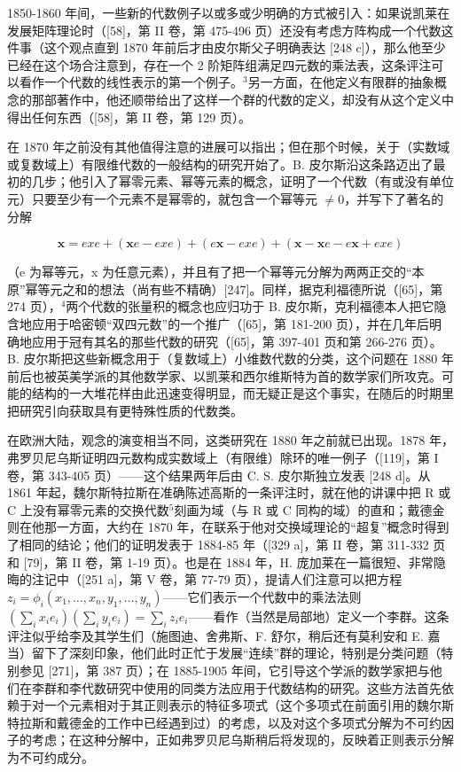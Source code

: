 1850-1860 年间，一些新的代数例子以或多或少明确的方式被引入：如果说凯莱在发展矩阵理论时（{[}58{]}，第 II 卷，第 475-496 页）还没有考虑方阵构成一个代数这件事（这个观点直到 1870 年前后才由皮尔斯父子明确表达 {[}248 c{]}），那么他至少已经在这个场合注意到，存在一个 2 阶矩阵组满足四元数的乘法表，这条评注可以看作一个代数的线性表示的第一个例子。\(^{3}\)另一方面，在他定义有限群的抽象概念的那部著作中，他还顺带给出了这样一个群的代数的定义，却没有从这个定义中得出任何东西（{[}58{]}，第 II 卷，第 129 页）。

在 1870 年之前没有其他值得注意的进展可以指出；但在那个时候，关于（实数域或复数域上）有限维代数的一般结构的研究开始了。B. 皮尔斯沿这条路迈出了最初的几步；他引入了幂零元素、幂等元素的概念，证明了一个代数（有或没有单位元）只要至少有一个元素不是幂零的，就包含一个幂等元 \(\neq 0\)，并写下了著名的分解

\[
\boldsymbol {x} = e x e + (\boldsymbol {x} e - e x e) + (e \boldsymbol {x} - e x e) + (\boldsymbol {x} - \boldsymbol {x} e - e \boldsymbol {x} + e x e)
\]

（e 为幂等元，x 为任意元素），并且有了把一个幂等元分解为两两正交的“本原”幂等元之和的想法（尚有些不精确）{[}247{]}。同样，据克利福德所说（{[}65{]}，第 274 页），\(^{4}\)两个代数的张量积的概念也应归功于 B. 皮尔斯，克利福德本人把它隐含地应用于哈密顿“双四元数”的一个推广（{[}65{]}，第 181-200 页），并在几年后明确地应用于冠有其名的那些代数的研究（{[}65{]}，第 397-401 页和第 266-276 页）。B. 皮尔斯把这些新概念用于（复数域上）小维数代数的分类，这个问题在 1880 年前后也被英美学派的其他数学家、以凯莱和西尔维斯特为首的数学家们所攻克。可能的结构的一大堆花样由此迅速变得明显，而无疑正是这个事实，在随后的时期里把研究引向获取具有更特殊性质的代数类。

在欧洲大陆，观念的演变相当不同，这类研究在 1880 年之前就已出现。1878 年，弗罗贝尼乌斯证明四元数构成实数域上（有限维）除环的唯一例子（{[}119{]}，第 I 卷，第 343-405 页）——这个结果两年后由 C. S. 皮尔斯独立发表 {[}248 d{]}。从 1861 年起，魏尔斯特拉斯在准确陈述高斯的一条评注时，就在他的讲课中把 R 或 C 上没有幂零元素的交换代数\(^{5}\)刻画为域（与 R 或 C 同构的域）的直和；戴德金则在他那一方面，大约在 1870 年，在联系于他对交换域理论的“超复”概念时得到了相同的结论；他们的证明发表于 1884-85 年（{[}329 a{]}，第 II 卷，第 311-332 页和 {[}79{]}，第 II 卷，第 1-19 页）。也是在 1884 年，H. 庞加莱在一篇很短、非常隐晦的注记中（{[}251 a{]}，第 V 卷，第 77-79 页），提请人们注意可以把方程 \(z_{i} = \phi_{i}(x_{1}, \ldots, x_{n}, y_{1}, \ldots, y_{n})\)——它们表示一个代数中的乘法法则 \((\sum_{i} x_{i} e_{i})(\sum_{i} y_{i} e_{i}) = \sum_{i} z_{i} e_{i}\)——看作（当然是局部地）定义一个李群。这条评注似乎给李及其学生们（施图迪、舍弗斯、F. 舒尔，稍后还有莫利安和 E. 嘉当）留下了深刻印象，他们此时正忙于发展“连续”群的理论，特别是分类问题（特别参见 {[}271{]}，第 387 页）；在 1885-1905 年间，它引导这个学派的数学家把与他们在李群和李代数研究中使用的同类方法应用于代数结构的研究。这些方法首先依赖于对一个元素相对于其正则表示的特征多项式（这个多项式在前面引用的魏尔斯特拉斯和戴德金的工作中已经遇到过）的考虑，以及对这个多项式分解为不可约因子的考虑；在这种分解中，正如弗罗贝尼乌斯稍后将发现的，反映着正则表示分解为不可约成分。

